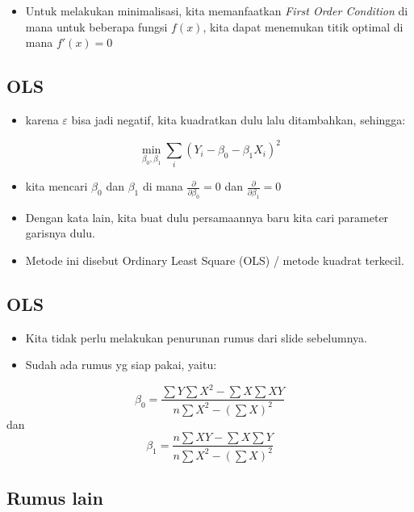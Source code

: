 \documentclass[
  letterpaper,
  DIV=11,
  numbers=noendperiod]{scrartcl}
\providecommand{\tightlist}{%
  \setlength{\itemsep}{0pt}\setlength{\parskip}{0pt}}\usepackage{longtable,booktabs,array}
\begin{document}
\begin{itemize}
\tightlist
\item
  Untuk melakukan minimalisasi, kita memanfaatkan \emph{First Order
  Condition} di mana untuk beberapa fungsi \(f(x)\), kita dapat
  menemukan titik optimal di mana \(f'(x)=0\)
\end{itemize}

\hypertarget{ols-1}{%
\subsection{OLS}\label{ols-1}}

\begin{itemize}
\tightlist
\item
  karena \(\varepsilon\) bisa jadi negatif, kita kuadratkan dulu lalu
  ditambahkan, sehingga:
\end{itemize}

\[
\min_{\beta_0,\beta_1} \sum_i \left(Y_i-\beta_0-\beta_1 X_i \right)^2
\]

\begin{itemize}
\item
  kita mencari \(\beta_0\) dan \(\beta_1\) di mana
  \(\frac{\partial}{\partial \beta_0}=0\) dan
  \(\frac{\partial}{\partial \beta_1}=0\)
\item
  Dengan kata lain, kita buat dulu persamaannya baru kita cari parameter
  garisnya dulu.
\item
  Metode ini disebut Ordinary Least Square (OLS) / metode kuadrat
  terkecil.
\end{itemize}

\hypertarget{ols-2}{%
\subsection{OLS}\label{ols-2}}

\begin{itemize}
\item
  Kita tidak perlu melakukan penurunan rumus dari slide sebelumnya.
\item
  Sudah ada rumus yg siap pakai, yaitu:
\end{itemize}

\[
\beta_0=\frac{\sum Y \sum X^2-\sum X \sum XY}{n\sum X^2-(\sum X)^2}
\] dan \[
\beta_1=\frac{n\sum XY - \sum X \sum Y}{n \sum X^2-(\sum X)^2}
\]

\hypertarget{rumus-lain}{%
\subsection{Rumus lain}\label{rumus-lain}}
\end{document}
